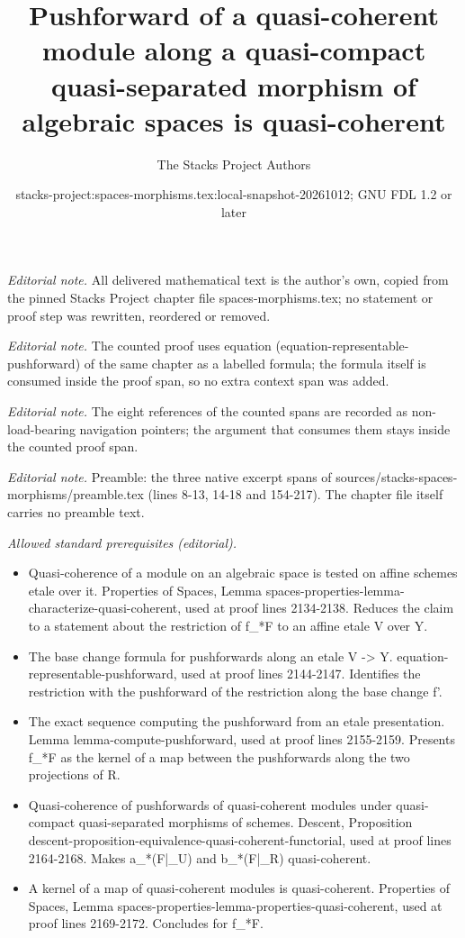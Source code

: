 \documentclass[10pt,a4paper]{amsart}
\title{Pushforward of a quasi-coherent module along a quasi-compact quasi-separated morphism of algebraic spaces is quasi-coherent}
\author{The Stacks Project Authors}
\date{stacks-project:spaces-morphisms.tex:local-snapshot-20261012; GNU FDL 1.2 or later}
\theoremstyle{plain}
\theoremstyle{definition}
\theoremstyle{remark}
\numberwithin{equation}{subsection}
\begin{document}
\maketitle
\setcounter{subsection}{1}
\noindent\textit{Editorial note.} All delivered mathematical text is the author's own, copied from the pinned Stacks Project chapter file spaces-morphisms.tex; no statement or proof step was rewritten, reordered or removed.\par\medskip
\noindent\textit{Editorial note.} The counted proof uses equation (equation-representable-pushforward) of the same chapter as a labelled formula; the formula itself is consumed inside the proof span, so no extra context span was added.\par\medskip
\noindent\textit{Editorial note.} The eight references of the counted spans are recorded as non-load-bearing navigation pointers; the argument that consumes them stays inside the counted proof span.\par\medskip
\noindent\textit{Editorial note.} Preamble: the three native excerpt spans of sources/stacks-spaces-morphisms/preamble.tex (lines 8-13, 14-18 and 154-217). The chapter file itself carries no preamble text.\par\medskip
\noindent\textit{Allowed standard prerequisites (editorial).}\begin{itemize}
\item Quasi-coherence of a module on an algebraic space is tested on affine schemes etale over it. Properties of Spaces, Lemma spaces-properties-lemma-characterize-quasi-coherent, used at proof lines 2134-2138. Reduces the claim to a statement about the restriction of f\_*F to an affine etale V over Y.
\item The base change formula for pushforwards along an etale V -> Y. equation-representable-pushforward, used at proof lines 2144-2147. Identifies the restriction with the pushforward of the restriction along the base change f'.
\item The exact sequence computing the pushforward from an etale presentation. Lemma lemma-compute-pushforward, used at proof lines 2155-2159. Presents f\_*F as the kernel of a map between the pushforwards along the two projections of R.
\item Quasi-coherence of pushforwards of quasi-coherent modules under quasi-compact quasi-separated morphisms of schemes. Descent, Proposition descent-proposition-equivalence-quasi-coherent-functorial, used at proof lines 2164-2168. Makes a\_*(F|\_U) and b\_*(F|\_R) quasi-coherent.
\item A kernel of a map of quasi-coherent modules is quasi-coherent. Properties of Spaces, Lemma spaces-properties-lemma-properties-quasi-coherent, used at proof lines 2169-2172. Concludes for f\_*F.
\end{itemize}\medskip
\end{document}
